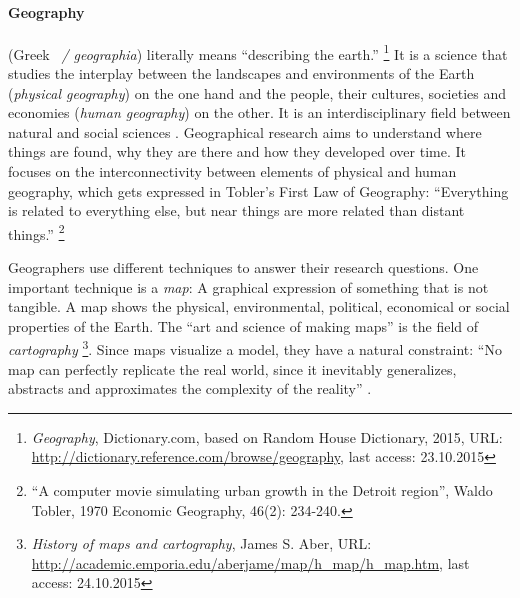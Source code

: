 \paragraph{Geography} %
\label{par:geography}

(Greek ~\emph{\textgamma\textepsilon\textomega\textgamma\textrho\textalpha\textphi\textiota\textalpha / geographia}) literally means ``describing the earth.''
\footnote{
  \emph{Geography},
  Dictionary.com, based on Random House Dictionary, 2015,
  URL: \url{http://dictionary.reference.com/browse/geography},
  last access: 23.10.2015
}
It is a science that studies the interplay between the landscapes and environments of the Earth (\emph{physical geography}) on the one hand and the people, their cultures, societies and economies (\emph{human geography}) on the other. It is an interdisciplinary field between natural and social sciences
\cite{rgsGeography}. Geographical research aims to understand where things are found, why they are there and how they developed over time. It focuses on the interconnectivity between elements of physical and human geography, which gets expressed in Tobler's First Law of Geography: ``Everything is related to everything else, but near things are more related than distant things.''
\footnote{
  ``A computer movie simulating urban growth in the Detroit region'',
  Waldo Tobler, 1970
  Economic Geography, 46(2): 234-240.
}

Geographers use different techniques to answer their research questions. One important technique is a \emph{map}: A graphical expression of something that is not tangible. A map shows the physical, environmental, political, economical or social properties of the Earth. The ``art and science of making maps'' is the field of \emph{cartography}
\footnote{
  \emph{History of maps and cartography},
  James S. Aber,
  URL: \url{http://academic.emporia.edu/aberjame/map/h_map/h_map.htm},
  last access: 24.10.2015
}.
Since maps visualize a model, they have a natural constraint: ``No map can perfectly replicate the real world, since it inevitably generalizes, abstracts and approximates the complexity of the reality''
\cite[p. 181]{knowles2008placing}.



\vspace{2em}

